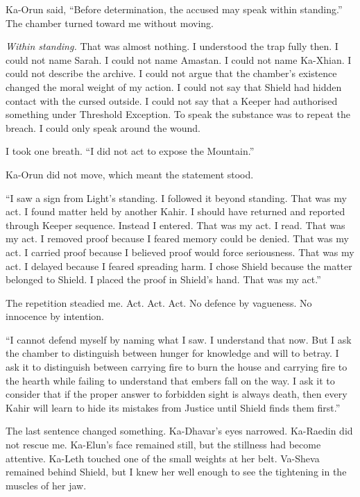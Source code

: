 Ka-Orun said, ``Before determination, the accused may speak within standing.'' The chamber turned toward me without moving.\par

\emph{Within standing.} That was almost nothing. I understood the trap fully then. I could not name Sarah. I could not name Amastan. I could not name Ka-Xhian. I could not describe the archive. I could not argue that the chamber's existence changed the moral weight of my action. I could not say that Shield had hidden contact with the cursed outside. I could not say that a Keeper had authorised something under Threshold Exception. To speak the substance was to repeat the breach. I could only speak around the wound.\par

I took one breath. ``I did not act to expose the Mountain.''\par

Ka-Orun did not move, which meant the statement stood.\par

``I saw a sign from Light's standing. I followed it beyond standing. That was my act. I found matter held by another Kahir. I should have returned and reported through Keeper sequence. Instead I entered. That was my act. I read. That was my act. I removed proof because I feared memory could be denied. That was my act. I carried proof because I believed proof would force seriousness. That was my act. I delayed because I feared spreading harm. I chose Shield because the matter belonged to Shield. I placed the proof in Shield's hand. That was my act.''\par

The repetition steadied me. Act. Act. Act. No defence by vagueness. No innocence by intention.\par

``I cannot defend myself by naming what I saw. I understand that now. But I ask the chamber to distinguish between hunger for knowledge and will to betray. I ask it to distinguish between carrying fire to burn the house and carrying fire to the hearth while failing to understand that embers fall on the way. I ask it to consider that if the proper answer to forbidden sight is always death, then every Kahir will learn to hide its mistakes from Justice until Shield finds them first.''\par

The last sentence changed something. Ka-Dhavar's eyes narrowed. Ka-Raedin did not rescue me. Ka-Elun's face remained still, but the stillness had become attentive. Ka-Leth touched one of the small weights at her belt. Va-Sheva remained behind Shield, but I knew her well enough to see the tightening in the muscles of her jaw.\par

